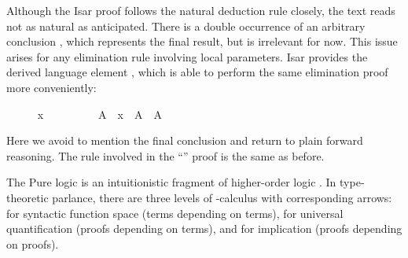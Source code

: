 \begin{isabellebody}
\begin{minipage}{0.4\textwidth}
\isamarkuptrue%
%
\end{minipage}
%
\begin{isamarkuptext}%
\medskip\noindent Although the Isar proof follows the natural
  deduction rule closely, the text reads not as natural as
  anticipated.  There is a double occurrence of an arbitrary
  conclusion , which represents the final result, but is
  irrelevant for now.  This issue arises for any elimination rule
  involving local parameters.  Isar provides the derived language
  element \hyperlink{command.obtain}{\mbox{}}, which is able to perform the same
  elimination proof more conveniently:%
\end{isamarkuptext}%
\isamarkuptrue%
%
\isadelimproof
%
\endisadelimproof
%
\isatagproof
\ \ \ \ \isamarkupfalse%
\ {\isachardoublequoteopen}x\ {\isasymin}\ {\isasymUnion}{\isasymA}{\isachardoublequoteclose}\isanewline
\ \ \ \ \isamarkupfalse%
\ \isamarkupfalse%
\ A\ \ {\isachardoublequoteopen}x\ {\isasymin}\ A{\isachardoublequoteclose}\ \ {\isachardoublequoteopen}A\ {\isasymin}\ {\isasymA}{\isachardoublequoteclose}\ \isacommand{{\isachardot}{\isachardot}}\isamarkupfalse%
%
\endisatagproof
{\isafoldproof}%
%
\isadelimproof
%
\endisadelimproof
%
\begin{isamarkuptext}%
\noindent Here we avoid to mention the final conclusion 
  and return to plain forward reasoning.  The rule involved in the
  ``\hyperlink{command.ddot}{\mbox{\isa{\isacommand{{\isachardot}{\isachardot}}}}}'' proof is the same as before.%
\end{isamarkuptext}%
\isamarkuptrue%
%
\isamarkuptrue%
%
\begin{isamarkuptext}%
The Pure logic \cite{paulson-found,paulson700} is an intuitionistic
  fragment of higher-order logic \cite{church40}.  In type-theoretic
  parlance, there are three levels of \isa{{\isachardoublequote}{\isasymlambda}{\isachardoublequote}}-calculus with
  corresponding arrows: \isa{{\isachardoublequote}{\isasymRightarrow}{\isachardoublequote}} for syntactic function space
  (terms depending on terms), \isa{{\isachardoublequote}{\isasymAnd}{\isachardoublequote}} for universal quantification
  (proofs depending on terms), and \isa{{\isachardoublequote}{\isasymLongrightarrow}{\isachardoublequote}} for implication (proofs
  depending on proofs).


\end{isamarkuptext}
\end{isabellebody}
